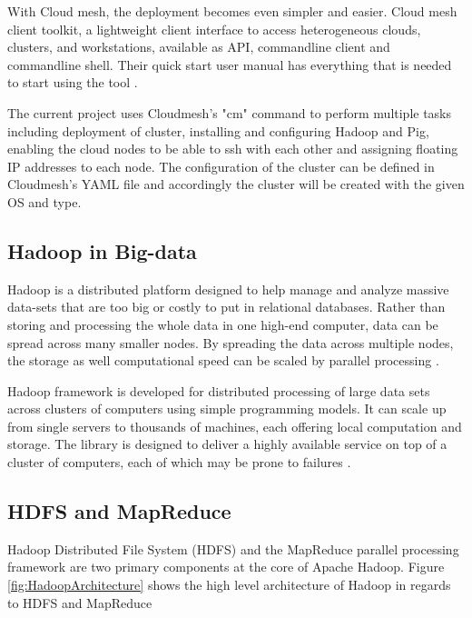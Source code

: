 \documentclass[9pt,twocolumn,twoside]{../../styles/osajnl}
\begin{document}
With Cloud mesh, the deployment becomes even simpler and easier. Cloud mesh client toolkit, a lightweight client interface to access heterogeneous clouds, clusters, and workstations, available as API, commandline client and commandline shell. Their quick start user manual has everything that is needed to start using the tool \cite{www-cm-docs}.

The current project uses Cloudmesh's "cm" command to perform multiple tasks including deployment of cluster, installing and configuring Hadoop and Pig, enabling the cloud nodes to be able to ssh with each other and assigning floating IP addresses to each node. The configuration of the cluster can be defined in Cloudmesh's YAML file and accordingly the cluster will be created with the given OS and type.

\subsection{Hadoop in Big-data}
Hadoop is a distributed platform designed to help manage and analyze massive data-sets that are too big or costly to put in relational databases. Rather than storing and processing the whole data in one high-end computer, data can be spread across many smaller nodes. By spreading the data across multiple nodes, the storage as well computational speed can be scaled by parallel processing \cite{www-thinkbig}.

Hadoop framework is developed for distributed processing of large data sets across clusters of computers using simple programming models. It can scale up from single servers to thousands of machines, each offering local computation and storage. The library is designed to deliver a highly available service on top of a cluster of computers, each of which may be prone to failures \cite{www-readwrite}.

\subsection{HDFS and MapReduce}
Hadoop Distributed File System (HDFS) and the MapReduce parallel processing framework are two primary components at the core of Apache Hadoop. Figure \ref{fig:HadoopArchitecture} shows the high level architecture of Hadoop in regards to HDFS and MapReduce 
\end{document}
